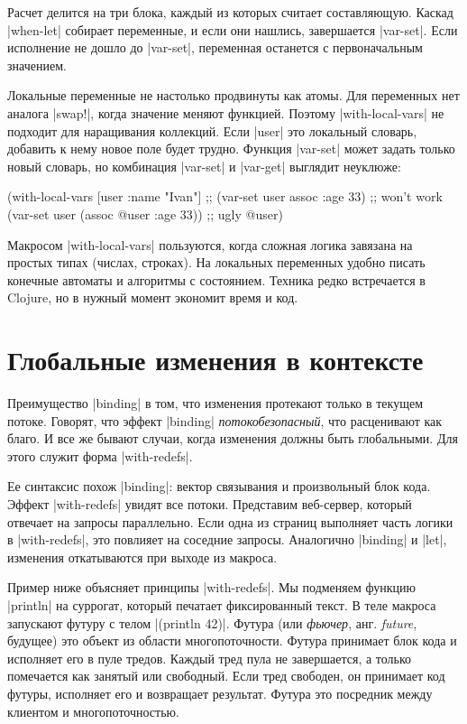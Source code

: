 Расчет делится на три блока, каждый из которых считает составляющую. Каскад
\spverb|when-let| собирает переменные, и если они нашлись, завершается
\spverb|var-set|. Если исполнение не дошло до \spverb|var-set|, переменная
останется с первоначальным значением.

Локальные переменные не настолько продвинуты как атомы. Для переменных нет
аналога \spverb|swap!|, когда значение меняют функцией. Поэтому
\spverb|with-local-vars| не подходит для наращивания коллекций. Если
\spverb|user| это локальный словарь, добавить к нему новое поле будет
трудно. Функция \spverb|var-set| может задать только новый словарь, но
комбинация \spverb|var-set| и \spverb|var-get| выглядит неуклюже:

\begin{english}
  \begin{clojure}
(with-local-vars [user {:name "Ivan"}]
  ;; (var-set user assoc :age 33) ;; won't work
  (var-set user (assoc @user :age 33)) ;; ugly
  @user)
  \end{clojure}
\end{english}

Макросом \spverb|with-local-vars| пользуются, когда сложная логика завязана на
простых типах (числах, строках). На локальных переменных удобно писать конечные
автоматы и алгоритмы с состоянием. Техника редко встречается в Clojure, но в
нужный момент экономит время и код.


\section{Глобальные изменения в контексте}

\label{with-redefs}

Преимущество \spverb|binding| в том, что изменения протекают только в текущем
потоке. Говорят, что эффект \spverb|binding| \emph{потокобезопасный}, что
расценивают как благо. И все же бывают случаи, когда изменения должны быть
глобальными. Для этого служит форма \spverb|with-redefs|.

Ее синтаксис похож \spverb|binding|: вектор связывания и произвольный блок
кода. Эффект \spverb|with-redefs| увидят все потоки. Представим веб-сервер,
который отвечает на запросы параллельно. Если одна из страниц выполняет часть
логики в \spverb|with-redefs|, это повлияет на соседние запросы. Аналогично
\spverb|binding| и \spverb|let|, изменения откатываются при выходе из макроса.

Пример ниже объясняет принципы \spverb|with-redefs|. Мы подменяем функцию
\spverb|println| на суррогат, который печатает фиксированный текст. В теле
макроса запускают футуру с телом \spverb|(println 42)|. Футура (или
\emph{фьючер}, анг. \emph{future}, будущее) это объект из области
многопоточности. Футура принимает блок кода и исполняет его в пуле
тредов. Каждый тред пула не завершается, а только помечается как занятый или
свободный. Если тред свободен, он принимает код футуры, исполняет его и
возвращает результат. Футура это посредник между клиентом и многопоточностью.

